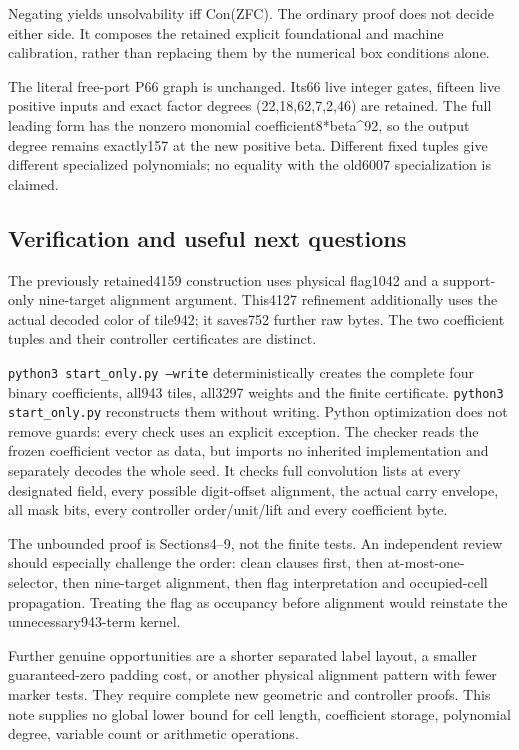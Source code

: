 Negating yields unsolvability iff Con(ZFC). The ordinary proof does not decide either side. It composes the retained explicit foundational and machine calibration, rather than replacing them by the numerical box conditions alone.

The literal free-port P66 graph is unchanged. Its66 live integer gates, fifteen live positive inputs and exact factor degrees (22,18,62,7,2,46) are retained. The full leading form has the nonzero monomial coefficient8*beta\textasciicircum{}92, so the output degree remains exactly157 at the new positive beta. Different fixed tuples give different specialized polynomials; no equality with the old6007 specialization is claimed.

\subsection{Verification and useful next questions}
The previously retained4159 construction uses physical flag1042 and a support-only nine-target alignment argument. This4127 refinement additionally uses the actual decoded color of tile942; it saves752 further raw bytes. The two coefficient tuples and their controller certificates are distinct.

\texttt{python3 start\_only.py --write} deterministically creates the complete four binary coefficients, all943 tiles, all3297 weights and the finite certificate. \texttt{python3 start\_only.py} reconstructs them without writing. Python optimization does not remove guards: every check uses an explicit exception. The checker reads the frozen coefficient vector as data, but imports no inherited implementation and separately decodes the whole seed. It checks full convolution lists at every designated field, every possible digit-offset alignment, the actual carry envelope, all mask bits, every controller order/unit/lift and every coefficient byte.

The unbounded proof is Sections4--9, not the finite tests. An independent review should especially challenge the order: clean clauses first, then at-most-one-selector, then nine-target alignment, then flag interpretation and occupied-cell propagation. Treating the flag as occupancy before alignment would reinstate the unnecessary943-term kernel.

Further genuine opportunities are a shorter separated label layout, a smaller guaranteed-zero padding cost, or another physical alignment pattern with fewer marker tests. They require complete new geometric and controller proofs. This note supplies no global lower bound for cell length, coefficient storage, polynomial degree, variable count or arithmetic operations.
